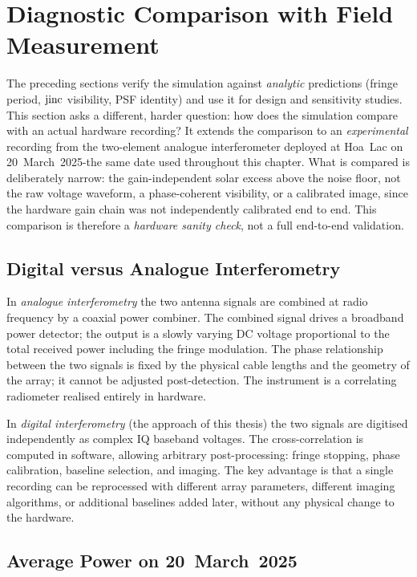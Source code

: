 \section{Diagnostic Comparison with Field Measurement}
\label{sec:real-comparison}

The preceding sections verify the simulation against \emph{analytic} predictions
(fringe period, $\operatorname{jinc}$ visibility, PSF identity) and use it for design and
sensitivity studies. This section asks a different, harder question: how does the
simulation compare with an actual hardware recording? It extends the comparison
to an \emph{experimental} recording from the two-element analogue interferometer
deployed at Hoa~Lac on 20~March~2025-the same date used throughout this chapter.
What is compared is deliberately narrow: the gain-independent solar excess above the
noise floor, not the raw voltage waveform, a phase-coherent visibility, or a
calibrated image, since the hardware gain chain was not independently calibrated end
to end. This comparison is therefore a \emph{hardware sanity check}, not a full
end-to-end validation.

\subsection{Digital versus Analogue Interferometry}

In \emph{analogue interferometry} the two antenna signals are combined at radio
frequency by a coaxial power combiner. The combined signal drives a broadband power
detector; the output is a slowly varying DC voltage proportional to the total received
power including the fringe modulation. The phase relationship between the two signals
is fixed by the physical cable lengths and the geometry of the array; it cannot be
adjusted post-detection. The instrument is a correlating radiometer realised entirely
in hardware.

In \emph{digital interferometry} (the approach of this thesis) the two signals are
digitised independently as complex IQ baseband voltages. The cross-correlation is
computed in software, allowing arbitrary post-processing: fringe stopping, phase
calibration, baseline selection, and imaging. The key advantage is that a single
recording can be reprocessed with different array parameters, different imaging
algorithms, or additional baselines added later, without any physical change to the
hardware.

\subsection{Average Power on 20~March~2025}

